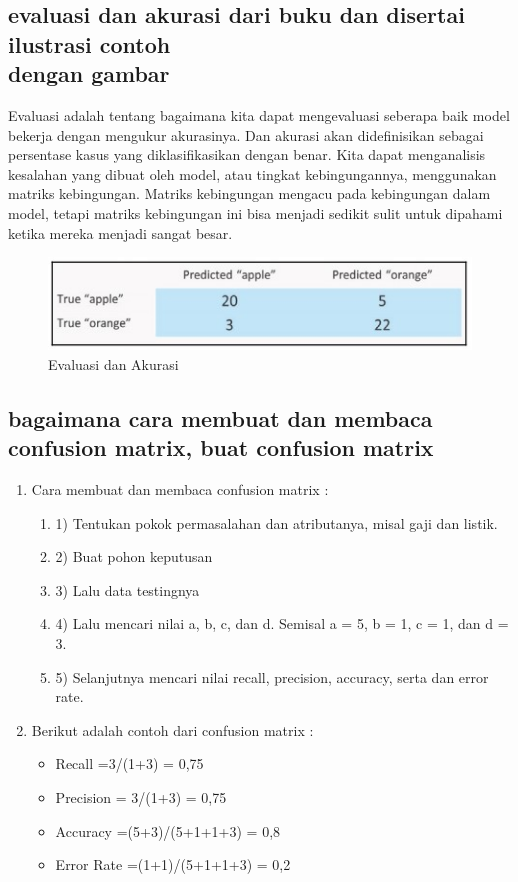 \subsection{evaluasi dan akurasi dari buku dan disertai ilustrasi contoh\\ dengan gambar}

\par Evaluasi adalah tentang bagaimana kita dapat mengevaluasi seberapa baik model bekerja dengan mengukur akurasinya. Dan akurasi akan didefinisikan sebagai persentase kasus yang diklasifikasikan dengan benar. Kita dapat menganalisis kesalahan yang dibuat oleh model, atau tingkat kebingungannya, menggunakan matriks kebingungan. Matriks kebingungan mengacu pada kebingungan dalam model, tetapi matriks kebingungan ini bisa menjadi sedikit sulit untuk dipahami ketika mereka menjadi sangat besar.

\begin{figure}[ht]
\centering
\includegraphics[scale=0.5]{figures/f9.jpg}
\caption{ Evaluasi dan Akurasi}
\label{contoh}
\end{figure}

\subsection{ bagaimana cara membuat dan membaca confusion matrix, buat confusion matrix }
\begin{enumerate}
\item Cara membuat dan membaca confusion matrix :
\begin{enumerate}
\item 1) Tentukan pokok permasalahan dan atributanya, misal gaji dan listik.
\item 2) Buat pohon keputusan
\item 3) Lalu data testingnya
\item 4) Lalu mencari nilai a, b, c, dan d. Semisal a = 5, b = 1, c = 1, dan d = 3.
\item 5) Selanjutnya mencari nilai recall, precision, accuracy, serta dan error rate.
\end{enumerate}

\item Berikut adalah contoh dari confusion matrix :
\begin{itemize}
\item Recall =3/(1+3) = 0,75
\item Precision = 3/(1+3) = 0,75
\item Accuracy =(5+3)/(5+1+1+3) = 0,8
\item Error Rate =(1+1)/(5+1+1+3) = 0,2
\end{itemize}
\end{enumerate}


